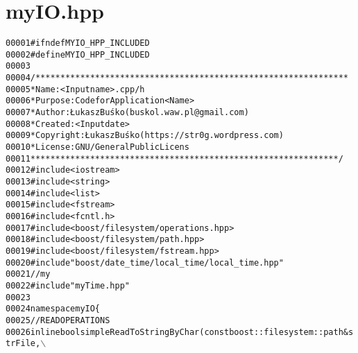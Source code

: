 \hypertarget{myIO_8hpp_source}{
\section{myIO.hpp}
}


\begin{footnotesize}\begin{alltt}
00001 \textcolor{preprocessor}{#ifndef MYIO\_HPP\_INCLUDED}
00002 \textcolor{preprocessor}{}\textcolor{preprocessor}{#define MYIO\_HPP\_INCLUDED}
00003 \textcolor{preprocessor}{}
00004 \textcolor{comment}{/***************************************************************}
00005 \textcolor{comment}{ * Name:      <Input name>.cpp/h}
00006 \textcolor{comment}{ * Purpose:   Code for Application <Name>}
00007 \textcolor{comment}{ * Author:    Łukasz Buśko (buskol.waw.pl@gmail.com)}
00008 \textcolor{comment}{ * Created:   <Input date>}
00009 \textcolor{comment}{ * Copyright: Łukasz Buśko (https://str0g.wordpress.com)}
00010 \textcolor{comment}{ * License:   GNU / General Public Licens}
00011 \textcolor{comment}{ **************************************************************/}
00012 \textcolor{preprocessor}{#include <iostream>}
00013 \textcolor{preprocessor}{#include <string>}
00014 \textcolor{preprocessor}{#include <list>}
00015 \textcolor{preprocessor}{#include <fstream>}
00016 \textcolor{preprocessor}{#include <fcntl.h>}
00017 \textcolor{preprocessor}{#include <boost/filesystem/operations.hpp>}
00018 \textcolor{preprocessor}{#include <boost/filesystem/path.hpp>}
00019 \textcolor{preprocessor}{#include <boost/filesystem/fstream.hpp>}
00020 \textcolor{preprocessor}{#include "boost/date\_time/local\_time/local\_time.hpp"}
00021 \textcolor{comment}{//my}
00022 \textcolor{preprocessor}{#include "myTime.hpp"}
00023 
00024 \textcolor{keyword}{namespace }myIO\{
00025     \textcolor{comment}{//READ OPERATIONS}
00026     \textcolor{keyword}{inline} \textcolor{keywordtype}{bool} simpleReadToStringByChar(\textcolor{keyword}{const} boost::filesystem::path &strFile,\(\backslash\)
      

\end{alltt}
\end{footnotesize}
